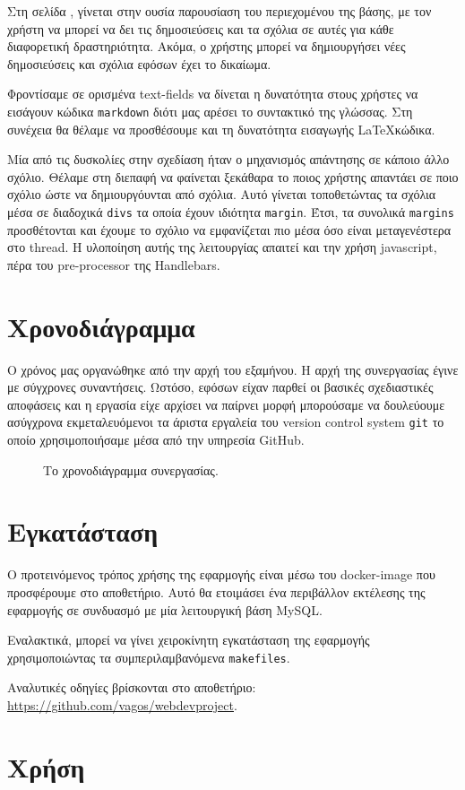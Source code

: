 \documentclass[nonacm, language=english, language=greek]{acmart}
\newcommand{\en}[1]{\textlatin{#1}}
\newcommand{\src}[1]{\texttt{\en{#1}}}
\begin{document}
Στη σελίδα \say{\en{Activities}}, γίνεται στην ουσία παρουσίαση του
περιεχομένου της βάσης, με τον χρήστη να μπορεί να δει τις δημοσιεύσεις και τα
σχόλια σε αυτές για κάθε διαφορετική δραστηριότητα. Ακόμα, ο χρήστης μπορεί να
δημιουργήσει νέες δημοσιεύσεις και σχόλια εφόσων έχει το δικαίωμα.

Φροντίσαμε σε ορισμένα \en{text-fields} να δίνεται η δυνατότητα 
στους χρήστες να εισάγουν κώδικα \src{markdown} διότι
μας αρέσει το συντακτικό της γλώσσας. Στη συνέχεια 
θα θέλαμε να προσθέσουμε και τη δυνατότητα εισαγωγής \LaTeX κώδικα.

Μία από τις δυσκολίες στην σχεδίαση ήταν ο μηχανισμός απάντησης
σε κάποιο άλλο σχόλιο. Θέλαμε στη διεπαφή να φαίνεται 
ξεκάθαρα το ποιος χρήστης απαντάει σε ποιο σχόλιο
ώστε να δημιουργόυνται  από σχόλια.
Αυτό γίνεται τοποθετώντας τα σχόλια μέσα σε διαδοχικά \src{divs}
τα οποία έχουν ιδιότητα \src{margin}. Έτσι, τα συνολικά 
\src{margins} προσθέτονται και έχουμε το σχόλιο να εμφανίζεται πιο μέσα 
όσο είναι μεταγενέστερα στο \en{thread}. Η υλοποίηση αυτής 
της λειτουργίας απαιτεί και την χρήση \en{javascript}, πέρα 
του \en{pre-processor} της \en{Handlebars}.

\section{Χρονοδιάγραμμα}

Ο χρόνος μας οργανώθηκε από την αρχή του εξαμήνου. Η αρχή της συνεργασίας έγινε
με σύγχρονες συναντήσεις. Ωστόσο, εφόσων είχαν παρθεί οι βασικές σχεδιαστικές
αποφάσεις και η εργασία είχε αρχίσει να παίρνει μορφή μπορούσαμε να δουλεύουμε
ασύγχρονα εκμεταλευόμενοι τα άριστα εργαλεία του \en{version control system}
\src{git} \cite{git} το οποίο χρησιμοποιήσαμε μέσα από την υπηρεσία
\en{GitHub}.

\begin{figure}
\begin{center}
    
\end{center}
    \caption{Το χρονοδιάγραμμα συνεργασίας.}
\end{figure}



\appendix

\section{Εγκατάσταση}

Ο προτεινόμενος τρόπος χρήσης της εφαρμογής είναι μέσω 
του \en{docker-image} που προσφέρουμε στο αποθετήριο. 
Αυτό θα ετοιμάσει ένα περιβάλλον εκτέλεσης της εφαρμογής 
σε συνδυασμό με μία λειτουργική βάση \en{MySQL}. 

Εναλακτικά, μπορεί να γίνει χειροκίνητη εγκατάσταση της εφαρμογής 
χρησιμοποιώντας τα συμπεριλαμβανόμενα \src{makefiles}.

Αναλυτικές οδηγίες βρίσκονται στο αποθετήριο: \en{\url{https://github.com/vagos/webdevproject}}.

\section{Χρήση}
\end{document}
